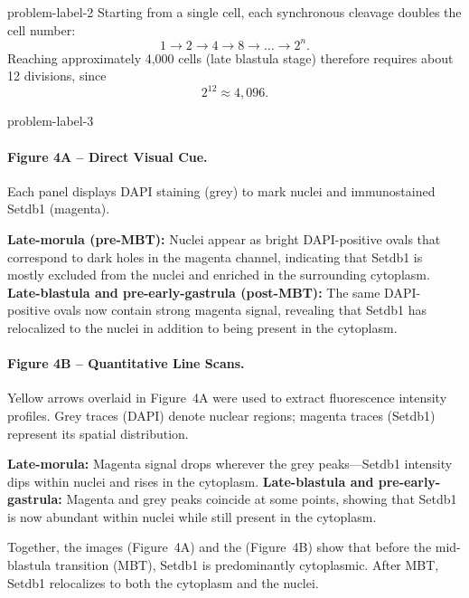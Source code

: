 \begin{multicols}{2}
\begin{problem}{}{problem-label-2}
    Starting from a single cell, each synchronous cleavage doubles the cell number:
    \[
    1 \rightarrow 2 \rightarrow 4 \rightarrow 8 \rightarrow \dots \rightarrow 2^n.
    \]
    Reaching approximately 4,000 cells (late blastula stage) therefore requires about 12 divisions, since
    \[
    2^{12} \approx 4,\!096.
    \]

\end{problem}


\begin{problem}{}{problem-label-3}

    \paragraph{Figure 4A – Direct Visual Cue.}
    Each panel displays DAPI staining (grey) to mark nuclei and immunostained Setdb1 (magenta).
    

\textbf{Late-morula (pre-MBT):} Nuclei appear as bright DAPI-positive ovals that correspond to dark holes in the magenta channel, indicating that Setdb1 is mostly excluded from the nuclei and enriched in the surrounding cytoplasm.
\textbf{Late-blastula and pre-early-gastrula (post-MBT):} The same DAPI-positive ovals now contain strong magenta signal, revealing that Setdb1 has relocalized to the nuclei in addition to being present in the cytoplasm.
 
    
    \paragraph{Figure 4B – Quantitative Line Scans.}
    Yellow arrows overlaid in Figure~4A were used to extract fluorescence intensity profiles. Grey traces (DAPI) denote nuclear regions; magenta traces (Setdb1) represent its spatial distribution.
    

 \textbf{Late-morula:} Magenta signal drops wherever the grey peaks—Setdb1 intensity dips within nuclei and rises in the cytoplasm.
 \textbf{Late-blastula and pre-early-gastrula:} Magenta and grey peaks coincide at some points, showing that Setdb1 is now abundant within nuclei while still present in the cytoplasm.

    
    \noindent
    Together, the images (Figure~4A) and the (Figure~4B) show that before the mid-blastula transition (MBT), Setdb1 is predominantly cytoplasmic. After MBT, Setdb1 relocalizes to both the cytoplasm and the nuclei.
    
\end{problem}


\end{multicols}









